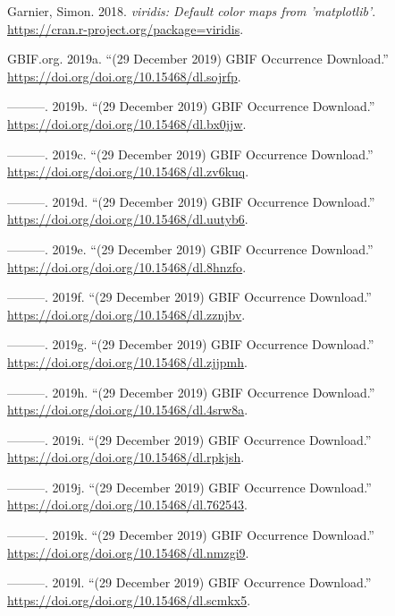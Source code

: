 \documentclass[fleqn,10pt,lineno]{wlpeerj} %
\begin{document}
\leavevmode\hypertarget{ref-Garnier2018}{}%
Garnier, Simon. 2018. \emph{viridis: Default color maps from 'matplotlib'}. \url{https://cran.r-project.org/package=viridis}.

\leavevmode\hypertarget{ref-GBIForg2019}{}%
GBIF.org. 2019a. ``(29 December 2019) GBIF Occurrence Download.'' \url{https://doi.org/doi.org/10.15468/dl.sojrfp}.

\leavevmode\hypertarget{ref-GBIForg2019a}{}%
---------. 2019b. ``(29 December 2019) GBIF Occurrence Download.'' \url{https://doi.org/doi.org/10.15468/dl.bx0jjw}.

\leavevmode\hypertarget{ref-GBIForg2019b}{}%
---------. 2019c. ``(29 December 2019) GBIF Occurrence Download.'' \url{https://doi.org/doi.org/10.15468/dl.zv6kuq}.

\leavevmode\hypertarget{ref-GBIForg2019c}{}%
---------. 2019d. ``(29 December 2019) GBIF Occurrence Download.'' \url{https://doi.org/doi.org/10.15468/dl.uutyb6}.

\leavevmode\hypertarget{ref-GBIForg2019d}{}%
---------. 2019e. ``(29 December 2019) GBIF Occurrence Download.'' \url{https://doi.org/doi.org/10.15468/dl.8hnzfo}.

\leavevmode\hypertarget{ref-GBIForg2019e}{}%
---------. 2019f. ``(29 December 2019) GBIF Occurrence Download.'' \url{https://doi.org/doi.org/10.15468/dl.zznjbv}.

\leavevmode\hypertarget{ref-GBIForg2019f}{}%
---------. 2019g. ``(29 December 2019) GBIF Occurrence Download.'' \url{https://doi.org/doi.org/10.15468/dl.zjjpmh}.

\leavevmode\hypertarget{ref-GBIForg2019g}{}%
---------. 2019h. ``(29 December 2019) GBIF Occurrence Download.'' \url{https://doi.org/doi.org/10.15468/dl.4srw8a}.

\leavevmode\hypertarget{ref-GBIForg2019h}{}%
---------. 2019i. ``(29 December 2019) GBIF Occurrence Download.'' \url{https://doi.org/doi.org/10.15468/dl.rpkjsh}.

\leavevmode\hypertarget{ref-GBIForg2019i}{}%
---------. 2019j. ``(29 December 2019) GBIF Occurrence Download.'' \url{https://doi.org/doi.org/10.15468/dl.762543}.

\leavevmode\hypertarget{ref-GBIForg2019j}{}%
---------. 2019k. ``(29 December 2019) GBIF Occurrence Download.'' \url{https://doi.org/doi.org/10.15468/dl.nmzgi9}.

\leavevmode\hypertarget{ref-GBIForg2019k}{}%
---------. 2019l. ``(29 December 2019) GBIF Occurrence Download.'' \url{https://doi.org/doi.org/10.15468/dl.scmkx5}.
\end{document}

